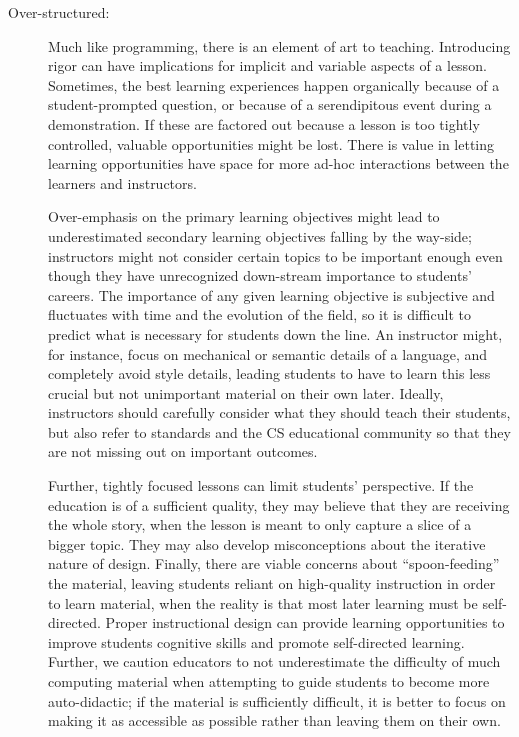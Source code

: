 \begin{description}
\item[Over-structured:]
Much like programming, there is an element of art to teaching.
Introducing rigor can have implications for implicit and variable aspects of a lesson.
Sometimes, the best learning experiences happen organically because of a student-prompted question, or because of a serendipitous event during a demonstration.
If these are factored out because a lesson is too tightly controlled, valuable opportunities might be lost.
There is value in letting learning opportunities have space for more ad-hoc interactions between the learners and instructors.

Over-emphasis on the primary learning objectives might lead to underestimated secondary learning objectives falling by the way-side;
instructors might not consider certain topics to be important enough even though they have unrecognized down-stream importance to students' careers.
The importance of any given learning objective is subjective and fluctuates with time and the evolution of the field, so it is difficult to predict what is necessary for students down the line.
An instructor might, for instance, focus on mechanical or semantic details of a language, and completely avoid style details, leading students to have to learn this less crucial but not unimportant material on their own later.
Ideally, instructors should carefully consider what they should teach their students, but also refer to standards and the CS educational community so that they are not missing out on important outcomes.

Further, tightly focused lessons can limit students' perspective.
If the education is of a sufficient quality, they may believe that they are receiving the whole story, when the lesson is meant to only capture a slice of a bigger topic.
They may also develop misconceptions about the iterative nature of design.
Finally, there are viable concerns about ``spoon-feeding'' the material, leaving students reliant on high-quality instruction in order to learn material, when the reality is that most later learning must be self-directed.
Proper instructional design can provide learning opportunities to improve students cognitive skills and promote self-directed learning.
Further, we caution educators to not underestimate the difficulty of much computing material when attempting to guide students to become more auto-didactic; if the material is sufficiently difficult, it is better to focus on making it as accessible as possible rather than leaving them on their own.

\end{description}


